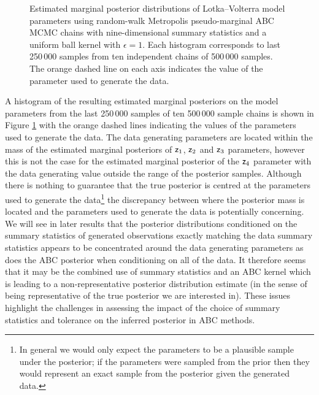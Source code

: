 \begin{figure}
\centering
{}
\caption[Lotka--Volterra model posterior histograms (1).]{Estimated marginal posterior distributions of Lotka--Volterra model parameters using random-walk Metropolis pseudo-marginal \ac{ABC} \ac{MCMC} chains with nine-dimensional summary statistics and a uniform ball kernel with $\epsilon = 1$. Each histogram corresponds to last 250\,000 samples from ten independent chains of 500\,000 samples. The orange dashed line on each axis indicates the value of the parameter used to generate the data.}
\label{fig:lotka-volterra-param-posterior-abc-summary}
\end{figure}

A histogram of the resulting estimated marginal posteriors on the model parameters from the last 250\,000 samples of ten 500\,000 sample chains is shown in Figure \ref{fig:lotka-volterra-param-posterior-abc-summary} with the orange dashed lines indicating the values of the parameters used to generate the data. The data generating parameters are located within the mass of the estimated marginal posteriors of $\mathsf{z}_1$, $\mathsf{z}_2$ and $\mathsf{z}_3$  parameters, however this is not the case for the estimated marginal posterior of the $\mathsf{z}_4$ parameter with the data generating value outside the range of the posterior samples. Although there is nothing to guarantee that the true posterior is centred at the parameters used to generate the data\footnote{In general we would only expect the parameters to be a plausible sample under the posterior; if the parameters were sampled from the prior then they would represent an exact sample from the posterior given the generated data.} the discrepancy between where the posterior mass is located and the parameters used to generate the data is potentially concerning. We will see in later results that the posterior distributions conditioned on the summary statistics of generated observations exactly matching the data summary statistics appears to be concentrated around the data generating parameters as does the \ac{ABC} posterior when conditioning on all of the data. It therefore seems that it may be the combined use of summary statistics and an \ac{ABC} kernel which is leading to a non-representative posterior distribution estimate (in the sense of being representative of the true posterior we are interested in). These issues highlight the challenges in assessing the impact of the choice of summary statistics and tolerance on the inferred posterior in \ac{ABC} methods.

